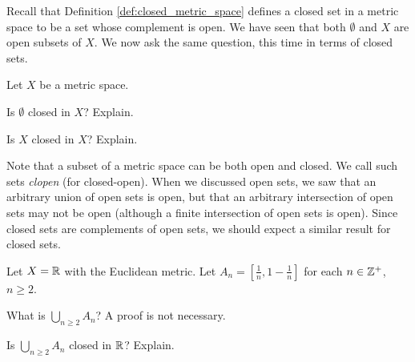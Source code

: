 
Recall that Definition \ref{def:closed_metric_space} defines a closed set in a metric space to be a set whose complement is open. We have seen that both $\emptyset$ and $X$ are open subsets of $X$. We now ask the same question, this time in terms of closed sets.  


\begin{activity} Let $X$ be a metric space.
\ba
\item Is $\emptyset$ closed in $X$? Explain.

\item Is $X$ closed in $X$? Explain.

\ea

\end{activity}

\begin{comment}

\ActivitySolution

\ba
\item Since $X \setminus \emptyset = X$ and $X$ is open in $X$, it follows that $\emptyset$ is closed in $X$. 

\item Since $X \setminus X = \emptyset$ and $\emptyset$ is open in $X$, it follows that $X$ is closed in $X$. 

\ea

\end{comment}


Note that a subset of a metric space can be both open and closed. We call such sets \emph{clopen} (for closed-open). When we discussed open sets, we saw that an arbitrary union of open sets is open, but that an arbitrary intersection of open sets may not be open (although a finite intersection of open sets is open). Since closed sets are complements of open sets, we should expect a similar result for closed sets.  

\begin{activity} \label{act:Closed_union} Let $X = \mathbb{R}$ with the Euclidean metric. Let $A_n = \left[\frac{1}{n}, 1-\frac{1}{n}\right]$ for each $n \in \mathbb{Z}^+$, $n \geq 2$.
\ba
\item What is $\bigcup_{n \geq 2} A_n$? A proof is not necessary.
		
\item Is $\bigcup_{n \geq 2} A_n$ closed in $\mathbb{R}$? Explain.

\ea

\end{activity}

